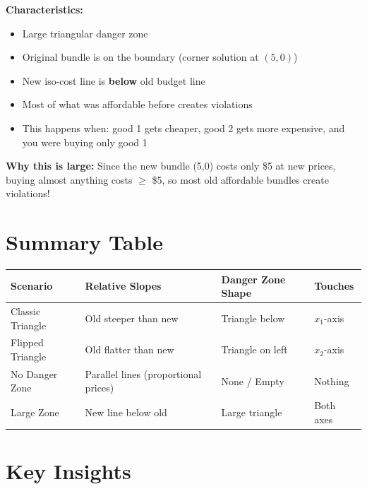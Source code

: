 \documentclass[11pt]{article}
\begin{document}
\textbf{Characteristics:}
\begin{itemize}
\item Large triangular danger zone
\item Original bundle is on the boundary (corner solution at $(5,0)$)
\item New iso-cost line is \textbf{below} old budget line
\item Most of what was affordable before creates violations
\item This happens when: good 1 gets cheaper, good 2 gets more expensive, and you were buying only good 1
\end{itemize}

\textbf{Why this is large:} Since the new bundle (5,0) costs only \$5 at new prices, buying almost anything costs $\geq$ \$5, so most old affordable bundles create violations!

\newpage

\section{Summary Table}

\begin{center}
\begin{tabular}{|p{3cm}|p{4cm}|p{4cm}|p{3cm}|}
\hline
\textbf{Scenario} & \textbf{Relative Slopes} & \textbf{Danger Zone Shape} & \textbf{Touches} \\
\hline
Classic Triangle & Old steeper than new & Triangle below & $x_1$-axis \\
\hline
Flipped Triangle & Old flatter than new & Triangle on left & $x_2$-axis \\
\hline
No Danger Zone & Parallel lines (proportional prices) & None / Empty & Nothing \\
\hline
Large Zone & New line below old & Large triangle & Both axes \\
\hline
\end{tabular}
\end{center}

\section{Key Insights}
\end{document}
